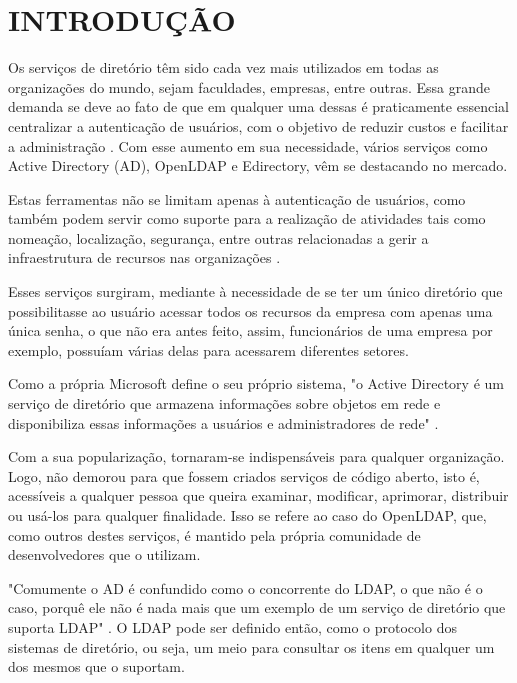 \section{INTRODUÇÃO}
Os serviços de diretório têm sido cada vez mais utilizados em todas as
organizações do mundo, sejam faculdades, empresas, entre outras. Essa
grande demanda se deve ao fato de que em qualquer uma dessas é praticamente essencial centralizar a autenticação de usuários, com o objetivo de reduzir custos e facilitar a administração \cite{berbelini}. Com esse aumento em sua necessidade, vários serviços como Active Directory (AD), OpenLDAP e Edirectory, vêm se destacando no mercado.

Estas ferramentas não se limitam apenas à autenticação de usuários, como também podem servir como suporte para a realização de atividades tais como nomeação, localização, segurança, entre outras relacionadas a gerir a infraestrutura de recursos nas organizações \cite{cruz2023}.

Esses serviços surgiram, mediante à necessidade de se ter um único diretório que possibilitasse ao usuário acessar todos os recursos da empresa com apenas uma única senha, o que não era antes feito, assim, funcionários de uma empresa por exemplo, possuíam várias delas para acessarem diferentes setores. 

Como a própria Microsoft define o seu próprio sistema, "o  Active  Directory é  um  serviço  de  diretório  que  armazena  informações sobre objetos em rede e disponibiliza essas informações a usuários e administradores de rede" \cite{microsoftlearn}.

Com a sua popularização, tornaram-se indispensáveis para qualquer organização. Logo, não demorou para que fossem criados serviços de código aberto, isto é, acessíveis a qualquer pessoa que queira examinar, modificar, aprimorar, distribuir ou usá-los para qualquer finalidade. Isso se refere ao caso do OpenLDAP, que, como outros destes serviços, é mantido pela própria comunidade de desenvolvedores que o utilizam.

"Comumente o AD é confundido como o concorrente do LDAP, o que não é o caso, porquê ele não é nada mais que um exemplo de um serviço de diretório que suporta LDAP" \cite{bertolli}. O LDAP pode ser definido então, como o protocolo dos sistemas de diretório, ou seja, um meio para consultar os itens em qualquer um dos mesmos que o suportam.